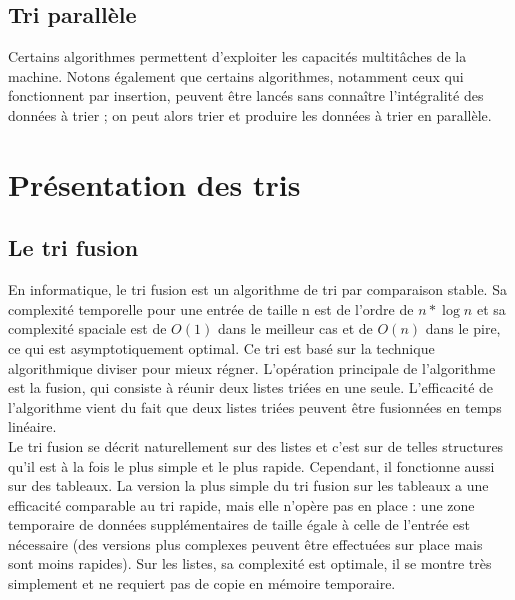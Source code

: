 \documentclass[11pt,a4paper]{article}
\begin{document}
\subsection{Tri parallèle}
Certains algorithmes permettent d'exploiter les capacités multitâches de la machine. Notons également que certains algorithmes, notamment ceux qui fonctionnent
par insertion, peuvent être lancés sans connaître l'intégralité des données à trier ; on peut alors trier et produire les données à trier en parallèle.

\section{Présentation des tris}
\subsection{Le tri fusion}
En informatique, le tri fusion est un algorithme de tri par comparaison stable. Sa complexité temporelle pour une entrée de taille n est de l'ordre de
$\displaystyle{n * \log n}$ et sa complexité spaciale est de $\displaystyle{O(1)}$ dans le meilleur cas et de $\displaystyle{O(n)}$ dans le pire,
ce qui est asymptotiquement optimal. Ce tri est basé sur la technique algorithmique diviser pour mieux régner. L'opération principale de
l'algorithme est la fusion, qui consiste à réunir deux listes triées en une seule. L'efficacité de l'algorithme vient du fait que deux listes triées peuvent être
fusionnées en temps linéaire.\\
Le tri fusion se décrit naturellement sur des listes et c'est sur de telles structures qu'il est à la fois le plus simple et le plus rapide. Cependant, il fonctionne
aussi sur des tableaux. La version la plus simple du tri fusion sur les tableaux a une efficacité comparable au tri rapide, mais elle n'opère pas en place : une zone
temporaire de données supplémentaires de taille égale à celle de l'entrée est nécessaire (des versions plus complexes peuvent être effectuées sur place
mais sont moins rapides). Sur les listes, sa complexité est optimale, il se montre très simplement et ne requiert pas de copie en mémoire temporaire.

\newpage
\end{document}
